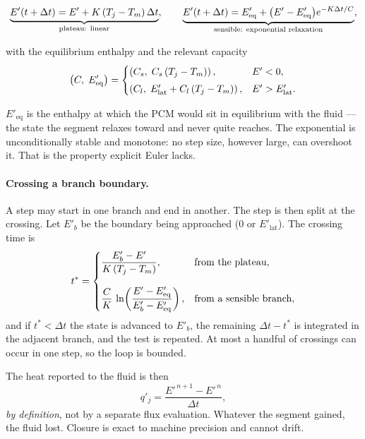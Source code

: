 \begin{equation}
  \underbrace{E'(t+\Delta t) = E' + K\left(T_{j}-T_{m}\right)\Delta t}
             _{\text{plateau: linear}},
  \qquad
  \underbrace{E'(t+\Delta t) = E'_{\mathrm{eq}}
    + \bigl(E'-E'_{\mathrm{eq}}\bigr)e^{-K\Delta t/C}}
             _{\text{sensible: exponential relaxation}},
  \label{eq:enth-exact}
\end{equation}

\noindent
with the equilibrium enthalpy and the relevant capacity
\begin{equation}
  \left(C,\;E'_{\mathrm{eq}}\right) =
  \begin{cases}
    \left(C_{s},\; C_{s}\left(T_{j}-T_{m}\right)\right), & E' < 0,\\[3pt]
    \left(C_{l},\; E'_{\mathrm{lat}} + C_{l}\left(T_{j}-T_{m}\right)\right),
      & E' > E'_{\mathrm{lat}}.
  \end{cases}
\end{equation}

$E'_{\mathrm{eq}}$ is the enthalpy at which the PCM would sit in equilibrium
with the fluid --- the state the segment relaxes toward and never quite reaches.
The exponential is unconditionally stable and monotone: no step size, however
large, can overshoot it. That is the property explicit Euler lacks.

\paragraph{Crossing a branch boundary.}
A step may start in one branch and end in another. The step is then split at the
crossing. Let $E'_{b}$ be the boundary being approached ($0$ or
$E'_{\mathrm{lat}}$). The crossing time is
\begin{equation}
  t^{*} =
  \begin{dcases}
    \frac{E'_{b}-E'}{K\left(T_{j}-T_{m}\right)}, & \text{from the plateau},\\[8pt]
    \frac{C}{K}\,
      \ln\!\left(\frac{E'-E'_{\mathrm{eq}}}{E'_{b}-E'_{\mathrm{eq}}}\right),
      & \text{from a sensible branch},
  \end{dcases}
  \label{eq:crossing}
\end{equation}
and if $t^{*} < \Delta t$ the state is advanced to $E'_{b}$, the remaining
$\Delta t - t^{*}$ is integrated in the adjacent branch, and the test is
repeated. At most a handful of crossings can occur in one step, so the loop is
bounded.

The heat reported to the fluid is then
\begin{equation}
  q'_{j} = \frac{E'^{\,n+1}-E'^{\,n}}{\Delta t},
  \label{eq:qfromE}
\end{equation}
\emph{by definition}, not by a separate flux evaluation. Whatever the segment
gained, the fluid lost. Closure is exact to machine precision and cannot drift.

